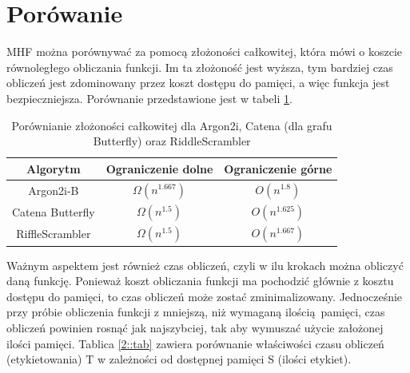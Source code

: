 \section{Porówanie}

MHF można porównywać za pomocą złożoności całkowitej, która mówi o koszcie równoległego obliczania funkcji.
Im ta złożoność jest wyższa, tym bardziej czas obliczeń jest zdominowany przez koszt dostępu do pamięci, a więc funkcja jest bezpieczniejsza. Porównanie przedstawione jest w tabeli \ref{2::tab2}.

\begin{table}[H]
	\centering
	\begin{tabular}{|c | c | c |} 
		\hline
		Algorytm & Ograniczenie dolne & Ograniczenie górne\\
		\hline
		Argon2i-B & $\Omega(n^{1.667})$ & $O(n^{1.8})$ \\
		\hline
		Catena Butterfly & $\Omega(n^{1.5})$ & $O(n^{1.625})$ \\
		\hline
		RiffleScrambler & $\Omega(n^{1.5})$ & $O(n^{1.667})$ \\
		\hline
	\end{tabular}
	\caption{\cite[Tablica 1]{depth} Porównianie złożoności całkowitej dla Argon2i, Catena (dla grafu Butterfly) oraz RiddleScrambler}
	\label{2::tab2}
\end{table}


 Ważnym aspektem jest również czas obliczeń, czyli w ilu krokach można obliczyć daną funkcję. Ponieważ koszt obliczania funkcji ma pochodzić głównie z kosztu dostępu do pamięci, to czas obliczeń może zostać zminimalizowany. Jednocześnie przy próbie obliczenia funkcji z mniejszą, niż wymaganą ilością pamięci, czas obliczeń powinien rosnąć jak najszybciej, tak aby wymuszać użycie założonej ilości pamięci.
 Tablica \ref{2::tab} zawiera porównanie właściwości czasu obliczeń (etykietowania) T w zależności od dostępnej pamięci S (ilości etykiet).
 

